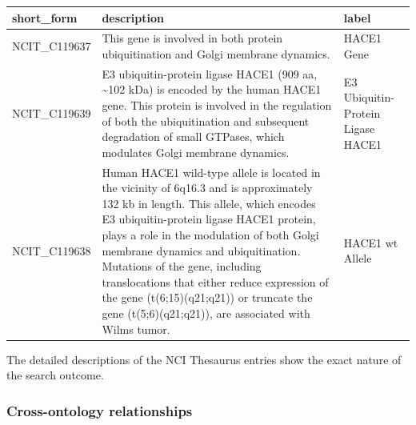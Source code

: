 \begin{Shaded}
\begin{Highlighting}[]
\StringTok{ }
\StringTok{ }\NormalTok{)}
\OperatorTok{$}\StringTok{ }\OperatorTok{$}
\NormalTok{(lk3[,}\OperatorTok{:}\NormalTok{], }\NormalTok{) }\OperatorTok{|}\ErrorTok{\textgreater{}}\StringTok{ }\NormalTok{(}\NormalTok{, }\NormalTok{) }\OperatorTok{|}\ErrorTok{\textgreater{}}\StringTok{ }\NormalTok{(}\NormalTok{,}
  \NormalTok{)}
\end{Highlighting}
\end{Shaded}

\begin{tabular}[t]{l>{\raggedright\arraybackslash}p{15em}>{\raggedright\arraybackslash}p{15em}}
\toprule
short\_form & description & label\\
\midrule
NCIT\_C119637 & This gene is involved in both protein ubiquitination and Golgi membrane dynamics. & HACE1 Gene\\
NCIT\_C119639 & E3 ubiquitin-protein ligase HACE1 (909 aa, \textasciitilde{}102 kDa) is encoded by the human HACE1 gene. This protein is involved in the regulation of both the ubiquitination and subsequent degradation of small GTPases, which modulates Golgi membrane dynamics. & E3 Ubiquitin-Protein Ligase HACE1\\
NCIT\_C119638 & Human HACE1 wild-type allele is located in the vicinity of 6q16.3 and is approximately 132 kb in length. This allele, which encodes E3 ubiquitin-protein ligase HACE1 protein, plays a role in the modulation of both Golgi membrane dynamics and ubiquitination. Mutations of the gene, including translocations that either reduce expression of the gene (t(6;15)(q21;q21)) or truncate the gene (t(5;6)(q21;q21)), are associated with Wilms tumor. & HACE1 wt Allele\\
\bottomrule
\end{tabular}

The detailed descriptions of the NCI Thesaurus entries show
the exact nature of the search outcome.

\hypertarget{cross-ontology-relationships}{%
\subsubsection{Cross-ontology relationships}\label{cross-ontology-relationships}}

